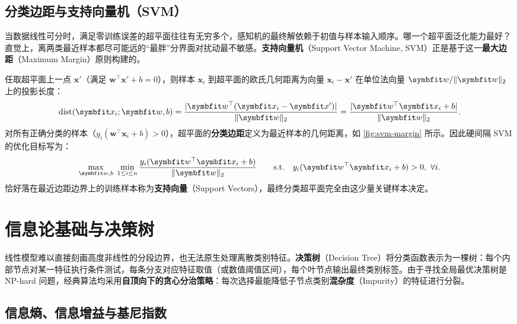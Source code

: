 \subsection{分类边距与支持向量机（SVM）}

当数据线性可分时，满足零训练误差的超平面往往有无穷多个，感知机的最终解依赖于初值与样本输入顺序。哪一个超平面泛化能力最好？直觉上，离两类最近样本都尽可能远的“最胖”分界面对扰动最不敏感。\textbf{支持向量机}（Support Vector Machine, SVM）正是基于这一\textbf{最大边距}（Maximum Margin）原则构建的。

任取超平面上一点 $\bm{x}'$（满足 $\bm{w}^\top\bm{x}' + b = 0$），则样本 $\bm{x}_i$ 到超平面的欧氏几何距离为向量 $\bm{x}_i - \bm{x}'$ 在单位法向量 $\bm{w}/\norm{\bm{w}}_2$ 上的投影长度：
\[
  \mathrm{dist}(\bm{x}_i; \bm{w}, b)
  = \frac{\abs{\bm{w}^\top(\bm{x}_i - \bm{x}')}}{\norm{\bm{w}}_2}
  = \frac{\abs{\bm{w}^\top\bm{x}_i + b}}{\norm{\bm{w}}_2}.
\]
对所有正确分类的样本（$y_i(\bm{w}^\top\bm{x}_i + b) > 0$），超平面的\textbf{分类边距}定义为最近样本的几何距离，如 \cref{fig:svm-margin} 所示。因此硬间隔 SVM 的优化目标写为：
\begin{equation}\label{eq:svm-margin}
  \max_{\bm{w}, b}\ \min_{1\le i\le n} \frac{y_i(\bm{w}^\top\bm{x}_i + b)}{\norm{\bm{w}}_2}
  \qquad \text{s.t.}\quad y_i(\bm{w}^\top\bm{x}_i + b) > 0,\ \forall i.
\end{equation}
恰好落在最近边距边界上的训练样本称为\textbf{支持向量}（Support Vectors），最终分类超平面完全由这少量关键样本决定。


\section{信息论基础与决策树}\label{sec:decision-tree}

线性模型难以直接刻画高度非线性的分段边界，也无法原生处理离散类别特征。\textbf{决策树}（Decision Tree）将分类函数表示为一棵树：每个内部节点对某一特征执行条件测试，每条分支对应特征取值（或数值阈值区间），每个叶节点输出最终类别标签。由于寻找全局最优决策树是 NP-hard 问题，经典算法均采用\textbf{自顶向下的贪心分治策略}：每次选择最能降低子节点类别\textbf{混杂度}（Impurity）的特征进行分裂。

\subsection{信息熵、信息增益与基尼指数}

